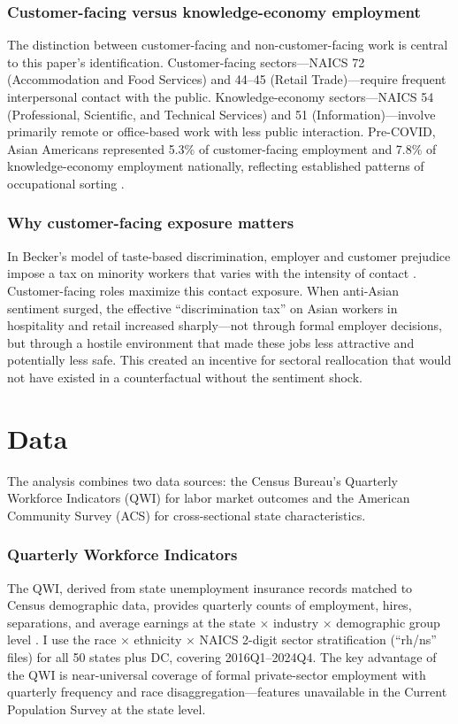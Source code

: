 \documentclass[12pt]{article}
\begin{document}
\subsubsection*{Customer-facing versus knowledge-economy employment} The distinction between customer-facing and non-customer-facing work is central to this paper's identification. Customer-facing sectors---NAICS 72 (Accommodation and Food Services) and 44--45 (Retail Trade)---require frequent interpersonal contact with the public. Knowledge-economy sectors---NAICS 54 (Professional, Scientific, and Technical Services) and 51 (Information)---involve primarily remote or office-based work with less public interaction. Pre-COVID, Asian Americans represented 5.3\% of customer-facing employment and 7.8\% of knowledge-economy employment nationally, reflecting established patterns of occupational sorting \citep{kim2007asian}.

\subsubsection*{Why customer-facing exposure matters} In Becker's model of taste-based discrimination, employer and customer prejudice impose a tax on minority workers that varies with the intensity of contact \citep{becker1957}. Customer-facing roles maximize this contact exposure. When anti-Asian sentiment surged, the effective ``discrimination tax'' on Asian workers in hospitality and retail increased sharply---not through formal employer decisions, but through a hostile environment that made these jobs less attractive and potentially less safe. This created an incentive for sectoral reallocation that would not have existed in a counterfactual without the sentiment shock.

\section{Data}

The analysis combines two data sources: the Census Bureau's Quarterly Workforce Indicators (QWI) for labor market outcomes and the American Community Survey (ACS) for cross-sectional state characteristics.

\subsubsection*{Quarterly Workforce Indicators} The QWI, derived from state unemployment insurance records matched to Census demographic data, provides quarterly counts of employment, hires, separations, and average earnings at the state $\times$ industry $\times$ demographic group level \citep{abowd2009qwi}. I use the race $\times$ ethnicity $\times$ NAICS 2-digit sector stratification (``rh/ns'' files) for all 50 states plus DC, covering 2016Q1--2024Q4. The key advantage of the QWI is near-universal coverage of formal private-sector employment with quarterly frequency and race disaggregation---features unavailable in the Current Population Survey at the state level.
\end{document}
